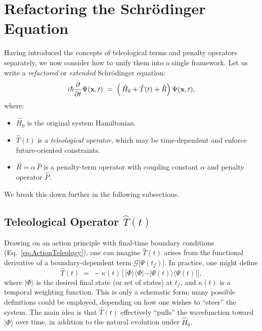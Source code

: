 \documentclass[11pt]{article}
\begin{document}
\section{Refactoring the Schr\"odinger Equation}
\label{sec:combined-equation}
Having introduced the concepts of teleological terms and penalty operators separately, we now consider how to unify them into a single framework. Let us write a \emph{refactored} or \emph{extended} Schr\"odinger equation:
\begin{equation}
\label{eq:RefactoredSchrodinger}
i\hbar \frac{\partial}{\partial t}\Psi(\mathbf{x}, t) 
\;=\; \Bigl(\,\hat{H}_0 + \hat{T}(t) + \hat{R}\Bigr)\,\Psi(\mathbf{x}, t),
\end{equation}
where:
\begin{itemize}
    \item $\hat{H}_0$ is the original system Hamiltonian.
    \item $\hat{T}(t)$ is a \emph{teleological operator}, which may be time-dependent and enforce future-oriented constraints.
    \item $\hat{R} = \alpha\,\hat{P}$ is a penalty-term operator with coupling constant $\alpha$ and penalty operator $\hat{P}$. 
\end{itemize}
We break this down further in the following subsections.

\subsection{Teleological Operator $\hat{T}(t)$}
Drawing on an action principle with final-time boundary conditions (Eq.~\eqref{eq:ActionTeleology}), one can imagine $\hat{T}(t)$ arises from the functional derivative of a boundary-dependent term $\mathcal{G}\bigl[\Psi(t_f)\bigr]$. In practice, one might define
\begin{equation}
\label{eq:Toperator}
\hat{T}(t) \;=\; -\kappa(t)\,\bigl[\,\vert \Phi\rangle \langle \Phi\vert - \vert \Psi(t)\rangle \langle \Psi(t)\vert \bigr],
\end{equation}
where $\vert \Phi\rangle$ is the desired final state (or set of states) at $t_f$, and $\kappa(t)$ is a temporal weighting function. This is only a schematic form; many possible definitions could be employed, depending on how one wishes to ``steer'' the system. The main idea is that $\hat{T}(t)$ effectively ``pulls'' the wavefunction toward $\vert \Phi\rangle$ over time, in addition to the natural evolution under $\hat{H}_0$.
\end{document}
